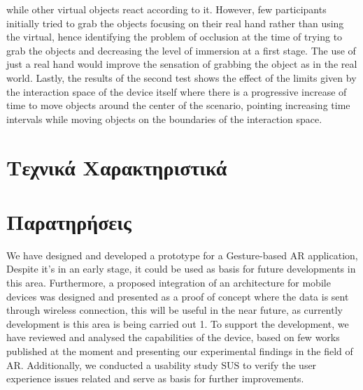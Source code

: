 while other virtual objects react according to it. However, few participants initially tried to grab the objects focusing on their real hand rather than using the virtual, hence identifying the problem of occlusion at the time of trying to grab the objects and decreasing the level of immersion at a first stage. The use of just a real hand would improve the sensation of grabbing the object as in the real world. Lastly, the results of the second test shows the effect of the limits given by the interaction space of the device itself where there is a progressive increase of time to move objects around the center of the scenario, pointing increasing time intervals while moving objects on the boundaries of the interaction space.
\section{Τεχνικά Χαρακτηριστικά}

\section{Παρατηρήσεις}

We have designed and developed a prototype for a Gesture-based AR application, Despite it’s in an early stage, it could be used as basis for future developments in this area. Furthermore, a proposed integration of an architecture for mobile devices was designed and presented as a proof of concept where the data is sent through wireless connection, this will be useful in the near future, as currently development is this area is being carried out 1. To support the development, we have reviewed and analysed the capabilities of the device, based on few works published at the moment and presenting our experimental findings in the field of AR. Additionally, we conducted a usability study SUS to verify the user experience issues related and serve as basis for further improvements.

